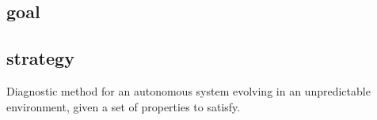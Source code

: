 \subsection{goal}
\begin{list}{-}{ }
	\item 
\end{list}

\subsection{strategy}
Diagnostic method for an autonomous system evolving in an unpredictable environment, given a set of properties to satisfy. 


